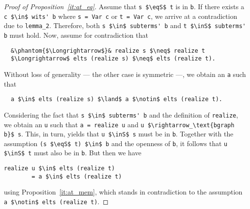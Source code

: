 \documentclass[sigplan,10pt,anonymous,review]{acmart}
\newcommand{\inS}{\in_\text{s}}
\newcommand{\eqS}{=_\text{s}}
\begin{document}
\begin{proof}[Proof of Proposition~\ref{it:at_eq}]
  Assume that \lstinline!s $\eqS$ t! is in \lstinline!b!.
  If there exists a \lstinline!c $\in$ wits' b! where \lstinline!s = Var c! or \lstinline!t = Var c!, we arrive at a contradiction due to \lstinline!lemma_2!.
  Therefore, both \lstinline!s $\in$ subterms' b! and \lstinline!t $\inS$ subterms' b! must hold.
  Now, assume for contradiction that
\begin{lstlisting}
  &\phantom{$\Longrightarrow$}& realize s $\neq$ realize t
  $\Longrightarrow$ elts (realize s) $\neq$ elts (realize t).
\end{lstlisting}
  Without loss of generality --- the other case is symmetric ---, we obtain an \lstinline!a! such that
\begin{lstlisting}
  a $\in$ elts (realize s) $\land$ a $\notin$ elts (realize t). 
\end{lstlisting}
  Considering the fact that \lstinline!s $\in$ subterms' b! and the definition of \lstinline!realize!, we obtain an \lstinline!u! such that \lstinline!a = realize u! and \lstinline!u $\rightarrow_\text{bgraph b}$ s!.
  This, in turn, yields that \lstinline!u $\inS$ s! must be in \lstinline!b!.
  Together with the assumption \lstinline!(s $\eqS$ t) $\in$ b! and the openness of \lstinline!b!, it follows that \lstinline!u $\inS$ t! must also be in \lstinline!b!.
  But then we have
\begin{lstlisting}[columns=fixed]
  realize u $\in$ elts (realize t)
        = a $\in$ elts (realize t)
\end{lstlisting}
  using Proposition~\ref{it:at_mem}, which stands in contradiction to the assumption \lstinline!a $\notin$ elts (realize t)!.
\end{proof}
\end{document}
